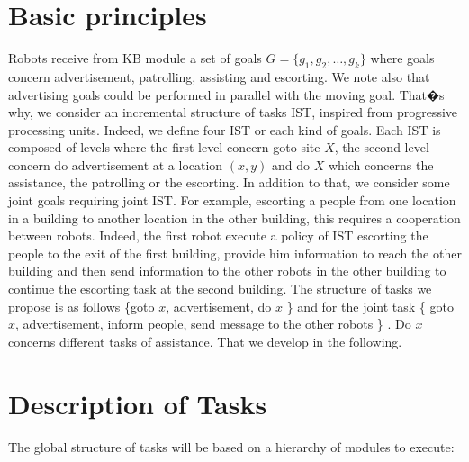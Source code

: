 \documentclass{article}
\begin{document}
\section {Basic principles}
Robots receive from KB module a set of goals $G = \{ g_{1}, g_{2}, \ldots, g_{k} \}$ where goals concern advertisement, patrolling, assisting and escorting.  We note also that advertising goals could be performed in parallel with the moving goal. That�s why, we consider an incremental structure of tasks IST, inspired from progressive processing units. Indeed, we define four IST or each kind of goals. Each IST is composed of levels where the first level concern goto site $X$, the second level concern do advertisement at a location $(x,y)$ and do $X$ which concerns the assistance, the patrolling or the escorting. In addition to that, we consider some joint goals requiring joint IST.  For example, escorting a people from one location in a building to another location in the other building, this requires a cooperation between robots. Indeed, the first robot execute a policy of IST escorting the people to the exit of the first building, provide him information to reach the other building and then send information to the other robots in the other building to continue the escorting task at the second building. The structure of tasks we propose is as follows \{goto $x$, advertisement, do $x$ \} and for the joint task {\sc \{ goto $x$, advertisement, inform people, send message to the other robots \}} . Do $x$ concerns different tasks of assistance. That we develop in the following. 

\section {Description of Tasks}

The global structure of tasks will be based on a hierarchy of modules to execute: 
\end{document}
